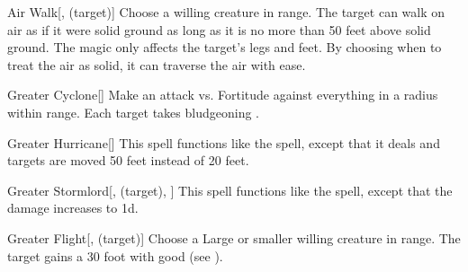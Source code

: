 \lowercase{\hypertarget{spell:Air Walk}{}}\label{spell:Air Walk}
\begin{attuneability}[\nth{5}]{\hypertarget{spell:Air Walk}{Air Walk}}[,  (target)]
Choose a willing creature in \rngclose range.
The target can walk on air as if it were solid ground as long as it is no more than 50 feet above solid ground.
The magic only affects the target's legs and feet.
By choosing when to treat the air as solid, it can traverse the air with ease.
\end{attuneability}
\vspace{0.25em}



\lowercase{\hypertarget{spell:Greater Cyclone}{}}\label{spell:Greater Cyclone}
\begin{freeability}[\nth{5}]{\hypertarget{spell:Greater Cyclone}{Greater Cyclone}}[]
Make an attack vs. Fortitude against everything in a \areamed radius within \rngmed range.
\hit Each target takes bludgeoning .
\end{freeability}
\vspace{0.25em}



\lowercase{\hypertarget{spell:Greater Hurricane}{}}\label{spell:Greater Hurricane}
\begin{freeability}[\nth{6}]{\hypertarget{spell:Greater Hurricane}{Greater Hurricane}}[]
This spell functions like the  spell, except that it deals  and targets are moved 50 feet instead of 20 feet.
\end{freeability}
\vspace{0.25em}



\lowercase{\hypertarget{spell:Greater Stormlord}{}}\label{spell:Greater Stormlord}
\begin{attuneability}[\nth{6}]{\hypertarget{spell:Greater Stormlord}{Greater Stormlord}}[,  (target), ]
This spell functions like the  spell, except that the damage increases to  \plus1d.
\end{attuneability}
\vspace{0.25em}



\lowercase{\hypertarget{spell:Greater Flight}{}}\label{spell:Greater Flight}
\begin{attuneability}[\nth{7}]{\hypertarget{spell:Greater Flight}{Greater Flight}}[,  (target)]
Choose a Large or smaller willing creature in \rngclose range.
The target gains a 30 foot  with good  (see ).
\end{attuneability}
\vspace{0.25em}


